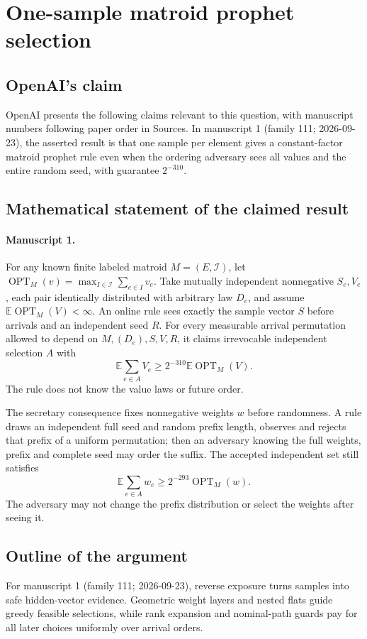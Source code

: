 \documentclass[11pt]{article}
\begin{document}
\section*{One-sample matroid prophet selection}

\subsection{OpenAI's claim}
OpenAI presents the following claims relevant to this question, with manuscript numbers following paper order in Sources. In manuscript 1 (family 111; 2026-09-23), the asserted result is that one sample per element gives a constant-factor matroid prophet rule even when the ordering adversary sees all values and the entire random seed, with guarantee $2^{-310}$.

\subsection{Mathematical statement of the claimed result}
\paragraph{Manuscript 1.}
For any known finite labeled matroid $M=(E,\mathcal I)$, let $\operatorname{OPT}_M(v)=\max_{I\in\mathcal I}\sum_{e\in I}v_e$. Take mutually independent nonnegative $S_e,V_e$, each pair identically distributed with arbitrary law $D_e$, and assume $\mathbb E\operatorname{OPT}_M(V)<\infty$. An online rule sees exactly the sample vector $S$ before arrivals and an independent seed $R$. For every measurable arrival permutation allowed to depend on $M,(D_e),S,V,R$, it claims irrevocable independent selection $A$ with
\[
 \mathbb E\sum_{e\in A}V_e\ge2^{-310}\mathbb E\operatorname{OPT}_M(V).
\]
The rule does not know the value laws or future order.

The secretary consequence fixes nonnegative weights $w$ before randomness. A rule draws an independent full seed and random prefix length, observes and rejects that prefix of a uniform permutation; then an adversary knowing the full weights, prefix and complete seed may order the suffix. The accepted independent set still satisfies
\[
 \mathbb E\sum_{e\in A}w_e\ge2^{-293}\operatorname{OPT}_M(w).
\]
The adversary may not change the prefix distribution or select the weights after seeing it.

\subsection{Outline of the argument}
For manuscript 1 (family 111; 2026-09-23), reverse exposure turns samples into safe hidden-vector evidence. Geometric weight layers and nested flats guide greedy feasible selections, while rank expansion and nominal-path guards pay for all later choices uniformly over arrival orders.
\end{document}
